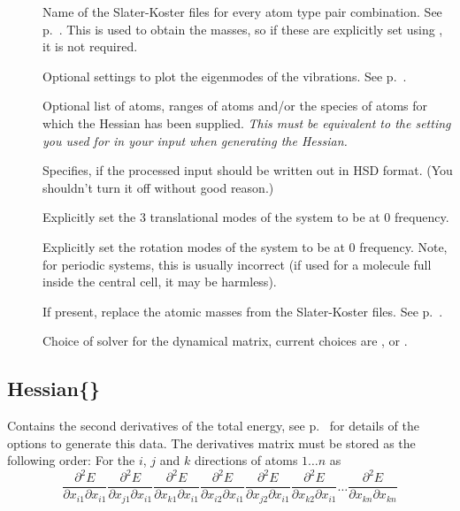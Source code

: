 \begin{description}
\item[] Name of the Slater-Koster files for
  every atom type pair combination. See
  p.~. This is used to obtain the
  masses, so if these are explicitly set using , it is
  not required.
\item[] Optional settings to plot the eigenmodes of the
  vibrations. See p.~.
\item[] Optional list of atoms, ranges of atoms and/or the species of
  atoms for which the Hessian has been supplied. \emph{This must be equivalent
    to the setting you used for  in your \dftbp{} input when
    generating the Hessian.}
\item[] Specifies, if the processed input should be written
  out in HSD format. (You shouldn't turn it off without good reason.)
\item[] Explicitly set the 3 translational modes of the
  system to be at 0 frequency.
\item[] Explicitly set the rotation modes of the system to be
  at 0 frequency. Note, for periodic systems, this is usually incorrect (if used
  for a molecule full inside the central cell, it may be harmless).
\item[] If present, replace the atomic masses from the
  Slater-Koster files. See p.~.
\item[] Choice of solver for the dynamical matrix,
  current choices are ,  or
  .
\end{description}


\subsection{Hessian\{\}}
\label{sec:modes.Hessian}

Contains the second derivatives of the total energy,
see p.~ for details of the \dftbp{}
options to generate this data. The derivatives matrix must be stored
as the following order: For the $i$, $j$ and $k$ directions of atoms
$1 \ldots n$ as
\begin{equation*}
  \frac{\partial^2 E}{\partial x_{i1} \partial x_{i1}} \frac{\partial^2
    E}{\partial x_{j1} \partial x_{i1}} \frac{\partial^2 E}{\partial x_{k1}
    \partial x_{i1}} \frac{\partial^2 E}{\partial x_{i2} \partial x_{i1}}
  \frac{\partial^2 E}{\partial x_{j2} \partial x_{i1}} \frac{\partial^2
    E}{\partial x_{k2} \partial x_{i1}} \ldots \frac{\partial^2 E}{\partial
    x_{kn} \partial x_{kn}}
\end{equation*}

